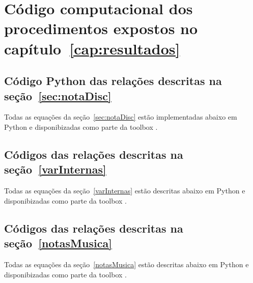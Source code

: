 \chapter{Código computacional dos procedimentos expostos no capítulo~\ref{cap:resultados}}
\label{cap:codigoProc}

\section{Código Python das relações descritas na seção~\ref{sec:notaDisc}}\label{sec:cod1}
Todas as equações da seção~\ref{sec:notaDisc} estão implementadas abaixo em Python e disponibizadas como parte da toolbox \massa.\cite{MASSA}






\section{Códigos das relações descritas na seção~\ref{varInternas}}\label{sec:cod2}
Todas as equações da seção~\ref{varInternas} estão descritas abaixo em Python e disponibizadas como parte da toolbox \massa.





\section{Códigos das relações descritas na seção~\ref{notasMusica}}\label{sec:cod3}
Todas as equações da seção~\ref{notasMusica} estão descritas abaixo em Python e disponibizadas como parte da toolbox \massa.


